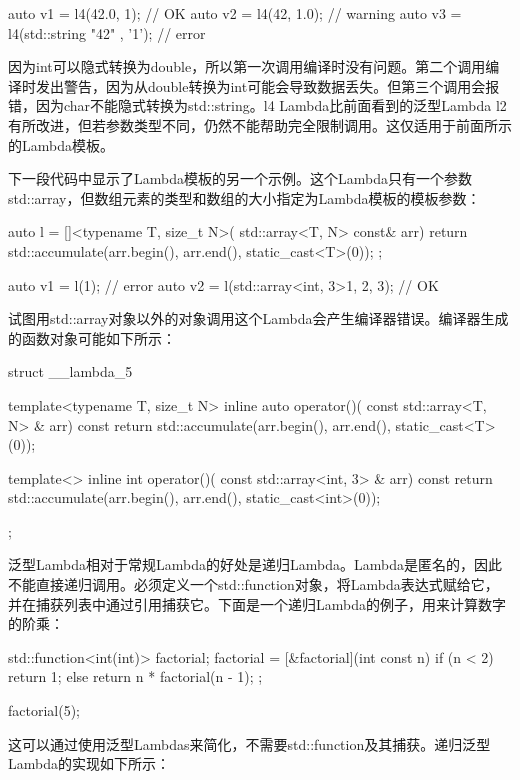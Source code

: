 \begin{cppcode}
auto v1 = l4(42.0, 1); // OK
auto v2 = l4(42, 1.0); // warning
auto v3 = l4(std::string{ "42" }, '1'); // error
\end{cppcode}

因为int可以隐式转换为double，所以第一次调用编译时没有问题。第二个调用编译时发出警告，因为从double转换为int可能会导致数据丢失。但第三个调用会报错，因为char不能隐式转换为std::string。l4 Lambda比前面看到的泛型Lambda l2有所改进，但若参数类型不同，仍然不能帮助完全限制调用。这仅适用于前面所示的Lambda模板。

下一段代码中显示了Lambda模板的另一个示例。这个Lambda只有一个参数std::array，但数组元素的类型和数组的大小指定为Lambda模板的模板参数：

\begin{cppcode}
auto l = []<typename T, size_t N>(
            std::array<T, N> const& arr)
{
	return std::accumulate(arr.begin(), arr.end(),
	                       static_cast<T>(0));
};

auto v1 = l(1); // error
auto v2 = l(std::array<int, 3>{1, 2, 3}); // OK
\end{cppcode}

试图用std::array对象以外的对象调用这个Lambda会产生编译器错误。编译器生成的函数对象可能如下所示：

\begin{cppcode}
struct __lambda_5
{
	template<typename T, size_t N>
	inline auto operator()(
		const std::array<T, N> & arr) const
	{
		return std::accumulate(arr.begin(), arr.end(),
							   static_cast<T>(0));
	}

	template<>
	inline int operator()(
		const std::array<int, 3> & arr) const
	{
		return std::accumulate(arr.begin(), arr.end(),
							   static_cast<int>(0));
	}
};
\end{cppcode}

泛型Lambda相对于常规Lambda的好处是递归Lambda。Lambda是匿名的，因此不能直接递归调用。必须定义一个std::function对象，将Lambda表达式赋给它，并在捕获列表中通过引用捕获它。下面是一个递归Lambda的例子，用来计算数字的阶乘：

\begin{cppcode}
std::function<int(int)> factorial;
factorial = [&factorial](int const n) {
	if (n < 2) return 1;
	else return n * factorial(n - 1);
};

factorial(5);
\end{cppcode}

这可以通过使用泛型Lambdas来简化，不需要std::function及其捕获。递归泛型Lambda的实现如下所示：

